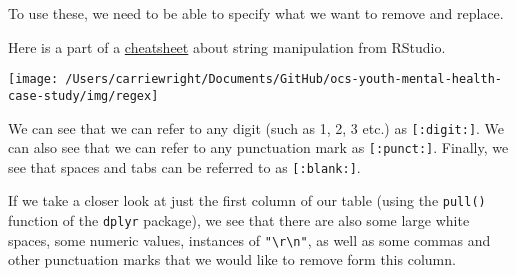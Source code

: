 \documentclass[
]{article}
\newenvironment{Shaded}{\begin{snugshade}}{\end{snugshade}}
\newcommand{\FloatTok}[1]{\textcolor[rgb]{0.00,0.00,0.81}{#1}}
\newcommand{\KeywordTok}[1]{\textcolor[rgb]{0.13,0.29,0.53}{\textbf{#1}}}
\newcommand{\NormalTok}[1]{#1}
\newcommand{\OperatorTok}[1]{\textcolor[rgb]{0.81,0.36,0.00}{\textbf{#1}}}
\newcommand{\StringTok}[1]{\textcolor[rgb]{0.31,0.60,0.02}{#1}}
\begin{document}
To use these, we need to be able to specify what we want to remove and
replace.

Here is a part of a
\href{https://rstudio.com/resources/cheatsheets/}{cheatsheet} about
string manipulation from RStudio.

\begin{center}\texttt{[image: /Users/carriewright/Documents/GitHub/ocs-youth-mental-health-case-study/img/regex]} \end{center}

We can see that we can refer to any digit (such as 1, 2, 3 etc.) as
\texttt{{[}:digit:{]}}. We can also see that we can refer to any
punctuation mark as \texttt{{[}:punct:{]}}. Finally, we see that spaces
and tabs can be referred to as \texttt{{[}:blank:{]}}.

If we take a closer look at just the first column of our table (using
the \texttt{pull()} function of the \texttt{dplyr} package), we see that
there are also some large white spaces, some numeric values, instances
of \texttt{"\textbackslash{}r\textbackslash{}n"}, as well as some commas
and other punctuation marks that we would like to remove form this
column.

\begin{Shaded}
\end{Shaded}
\end{document}
